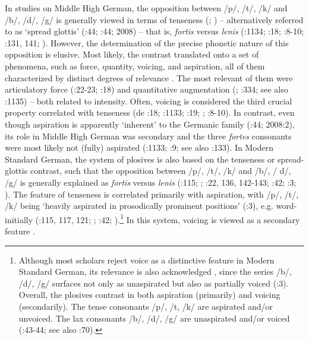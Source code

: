 \documentclass[output=paper]{langscibook}
\begin{document}
In studies on Middle High German, the opposition between /p/, /t/, /k/ and /b/, /d/, /g/ is generally viewed in terms of tenseness (\citealt{Goblirsch1997,20181997}; \citealt{Jessen1998}) – alternatively referred to as ‘spread glottis’ (\citealt{Harbert2007}:44; \citealt{IversonSalmons2003}:44; 2008) – that is, \textit{fortis} versus \textit{lenis} (\citealt{Simmler1985}:1134; \citealt{Weddige2007}:18; \citealt{Hennings2012}:8-10; \citealt{Paul2007}:131, 141; \citealt{MoosmüllerBrandstätter2015}). However, the determination of the precise phonetic nature of this opposition is elusive. Most likely, the contrast translated onto a set of phenomena, such as force, quantity, voicing, and aspiration, all of them characterized by distinct degrees of relevance \citep[1133-1135]{Simmler1985}. The most relevant of them were articulatory force (\citealt{Wright1917}:22-23; \citealt{Weddige2007}:18) and quantitative augmentation (\citealt{Goblirsch1997,20181997}; \citealt{Jessen1998}:334; see also \citealt{Simmler1985}:1135) – both related to intensity. Often, voicing is considered the third crucial property correlated with tenseness (de \citealt{BoorWisniewski1973}:18; \citealt{Simmler1985}:1133; \citealt{Weddige2007}:19; \citealt{Seiler2009}; \citealt{Hennings2012}:8-10). In contrast, even though aspiration is apparently ‘inherent’ to the Germanic family (\citealt{IversonSalmons2003}:44; 2008:2), its role in Middle High German was secondary and the three \textit{fortes} consonants were most likely not (fully) aspirated (\citealt{Simmler1985}:1133; \citealt{Hennings2012}:9; see also \citealt{Paul2007}:133). In Modern Standard German, the system of plosives is also based on the tenseness or spread-glottis contrast, such that the opposition between /p/, /t/, /k/ and /b/, / d/, /g/ is generally explained as \textit{fortis} versus \textit{lenis} (\citealt{Russ1994}:115; \citealt{Wiese1996}; \citealt{Jessen1998}:22, 136, 142-143; \citealt{Fox2005}:42; \citealt{IversonSalmons2008}:3; \citealt{Caratini2009}). The feature of tenseness is correlated primarily with aspiration, with /p/, /t/, /k/ being ‘heavily aspirated in prosodically prominent positions’ (\citealt{IversonSalmons2008}:3), e.g. word-initially (\citealt{Russ1994}:115, 117, 121; \citealt{IversonSalmons2003,20082003}; \citealt{Fox2005}:42; \citealt{Caratini2009}).\footnote{Although most scholars reject voice as a distinctive feature in Modern Standard German, its relevance is also acknowledged \citep[169]{Wiese1996}, since the series /b/, /d/, /g/ surfaces not only as unaspirated but also as partially voiced (\citealt{IversonSalmons2008}:3). Overall, the plosives contrast in both aspiration (primarily) and voicing (secondarily). The tense consonants /p/, /t, /k/ are aspirated and/or unvoiced. The lax consonants /b/, /d/, /g/ are unaspirated and/or voiced (\citealt{Jessen1998}:43-44; see also \citealt{Caratini2009}:70).} In this system, voicing is viewed as a secondary feature \citep[334]{Jessen1998}.
\end{document}
